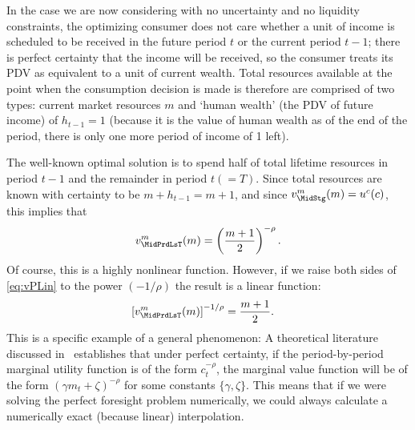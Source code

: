 \documentclass[titlepage, headings=optiontotocandhead]{Resources/texmf-local/tex/latex/econtex}
\begin{document}
In the case we are now considering with no uncertainty and no liquidity constraints, the optimizing consumer does not care whether a unit of income is scheduled to be received in the future period $t$ or the current period $t-1$; there is perfect certainty that the income will be received, so the consumer treats its PDV as equivalent to a unit of current wealth.  Total resources available at the point when the consumption decision is made is therefore are comprised of two types: current market resources $m$ and `human wealth' (the PDV of future income) of $h_{t-1}=1$ (because it is the value of human wealth as of the end of the period, there is only one more period of income of 1 left).

The well-known optimal solution is to spend half of total lifetime resources in period $t-1$ and the remainder in period $t (=T)$.  Since total resources are known with certainty to be $m+h_{t-1}= m+1$, and since $v_{\MidStg}^{m}(m) = u^{c}(c)$, this implies that
\begin{equation}
  v^{m}_{\MidPrdLsT}(m)  = \left(\frac{m+1}{2}\right)^{-\rho} \label{eq:vPLin}.
\end{equation}
Of course, this is a highly nonlinear function.  However, if we raise both sides of \eqref{eq:vPLin} to the power $(-1/\rho)$ the result is a linear function:
\begin{equation}\begin{gathered}\begin{aligned}
      \left[v^{m}_{\MidPrdLsT}(m)\right]^{-1/\rho}  & = \frac{m+1}{2}  .
    \end{aligned}\end{gathered}\end{equation}
This is a specific example of a general phenomenon: A theoretical literature discussed in~\cite{ckConcavity} establishes that under perfect certainty, if the period-by-period marginal utility function is of the form $c_{t}^{-\rho}$, the marginal value function will be of the form $(\gamma m_{t}+\zeta)^{-\rho}$ for some constants $\{\gamma,\zeta\}$.  This means that if we were solving the perfect foresight problem numerically, we could always calculate a numerically exact (because linear) interpolation.
\end{document}
